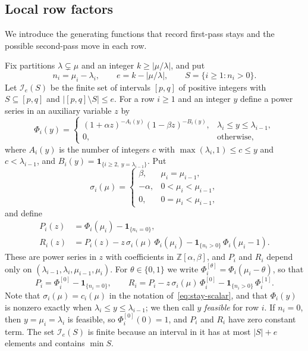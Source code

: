 \documentclass[11pt]{amsart}
\numberwithin{equation}{section}
\theoremstyle{definition}
\theoremstyle{remark}
\newcommand{\ind}{\mathbf 1}
\newcommand{\cI}{\mathcal I}
\newcommand{\ZZ}{\mathbb Z}
\begin{document}
\subsection{Local row factors}

We introduce the generating functions that record first-pass
stays and the possible second-pass move in each row.

Fix partitions $\lambda\subsetneq\mu$ and an integer $k\geq|\mu/\lambda|$,
and put
\[
 n_i=\mu_i-\lambda_i,\qquad e=k-|\mu/\lambda|,\qquad S=\{i\geq1:n_i>0\}.
\]
Let $\cI_e(S)$ be the finite set of intervals $[p,q]$ of positive integers
with $S\subseteq[p,q]$ and $|[p,q]\setminus S|\leq e$. For a row $i\geq1$ and
an integer $y$ define a power series in an auxiliary variable $z$ by
\begin{equation}\label{eq:Phi-def}
 \Phi_i(y)=
 \begin{cases}
  (1+\alpha z)^{-A_i(y)}(1-\beta z)^{-B_i(y)},&\lambda_i\leq y\leq\lambda_{i-1},\\
  0,&\text{otherwise},
 \end{cases}
\end{equation}
where $A_i(y)$ is the number of integers $c$ with
$\max(\lambda_i,1)\leq c\leq y$ and $c<\lambda_{i-1}$, and
$B_i(y)=\ind_{\{i\geq2,\ y=\lambda_{i-1}\}}$. Put
\begin{equation}\label{eq:sigma-def}
 \sigma_i(\mu)=
 \begin{cases}
  \beta,&\mu_i=\mu_{i-1},\\
  -\alpha,&0<\mu_i<\mu_{i-1},\\
  0,&0=\mu_i<\mu_{i-1},
 \end{cases}
\end{equation}
and define
\begin{align}
 P_i(z)&=\Phi_i(\mu_i)-\ind_{\{n_i=0\}},\label{eq:P-def}\\
 R_i(z)&=P_i(z)-z\,\sigma_i(\mu)\,\Phi_i(\mu_i)-\ind_{\{n_i>0\}}\,\Phi_i(\mu_i-1).
 \label{eq:R-def}
\end{align}
These are power series in $z$ with coefficients in $\ZZ[\alpha,\beta]$, and
$P_i$ and $R_i$ depend only on $(\lambda_{i-1},\lambda_i,\mu_{i-1},\mu_i)$. For
$\theta\in\{0,1\}$ we write $\Phi^{[\theta]}_i=\Phi_i(\mu_i-\theta)$, so that
\[
 P_i=\Phi^{[0]}_i-\ind_{\{n_i=0\}},\qquad
 R_i=P_i-z\,\sigma_i(\mu)\,\Phi^{[0]}_i-\ind_{\{n_i>0\}}\,\Phi^{[1]}_i .
\]
Note that $\sigma_i(\mu)=c_i(\mu)$ in the notation of~\eqref{eq:stay-scalar},
and that $\Phi_i(y)$ is nonzero exactly when $\lambda_i\leq y\leq\lambda_{i-1}$;
we then call $y$ \emph{feasible} for row $i$. If $n_i=0$, then $y=\mu_i=\lambda_i$
is feasible, so $\Phi^{[0]}_i(0)=1$, and $P_i$ and $R_i$ have zero constant
term. The set $\cI_e(S)$ is finite because an interval in it has at most
$|S|+e$ elements and contains $\min S$.
\end{document}
